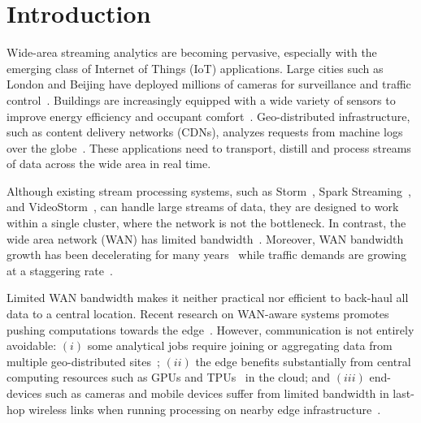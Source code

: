 \section{Introduction}

Wide-area streaming analytics are becoming pervasive, especially with the
emerging class of Internet of Things (IoT) applications.  Large cities such as
London and Beijing have deployed millions of cameras for surveillance and
traffic control~\cite{skynet, london.surveillance}. Buildings are increasingly
equipped with a wide variety of sensors to improve energy efficiency and
occupant comfort~\cite{krioukov2012building}. Geo-distributed infrastructure,
such as content delivery networks (CDNs), analyzes requests from machine logs
over the globe~\cite{mukerjee2015practical}. These applications need to
transport, distill and process streams of data across the wide area in real
time.

Although existing stream processing systems, such as
Storm~\cite{toshniwal2014storm}, Spark Streaming~\cite{zaharia2013discretized},
and VideoStorm~\cite{zhang2017live}, can handle large streams of data, they are
designed to work within a single cluster, where the network is not the
bottleneck.  In contrast, the wide area network (WAN) has limited
bandwidth~\cite{hsieh17gaia, vulimiri2015global}. Moreover, WAN bandwidth growth
has been decelerating for many years~\cite{global2016telegeography} while
traffic demands are growing at a staggering rate~\cite{index2013zettabyte}.

Limited WAN bandwidth makes it neither practical nor efficient to back-haul all
data to a central location.  Recent research on WAN-aware systems promotes
pushing computations towards the edge~\cite{pu2015low, rabkin2014aggregation,
  satyanarayanan2009case}. However, communication is not entirely avoidable:
$(i)$ some analytical jobs require joining or aggregating data from multiple
geo-distributed sites~\cite{pu2015low, viswanathan2016clarinet}; $(ii)$ the edge
benefits substantially from central computing resources such as GPUs and
TPUs~\cite{abadi2016tensorflow} in the cloud; and $(iii)$ end-devices such as
cameras and mobile devices suffer from limited bandwidth in last-hop wireless
links when running processing on nearby edge
infrastructure~\cite{abari2017enabling, zhang2015design}.


